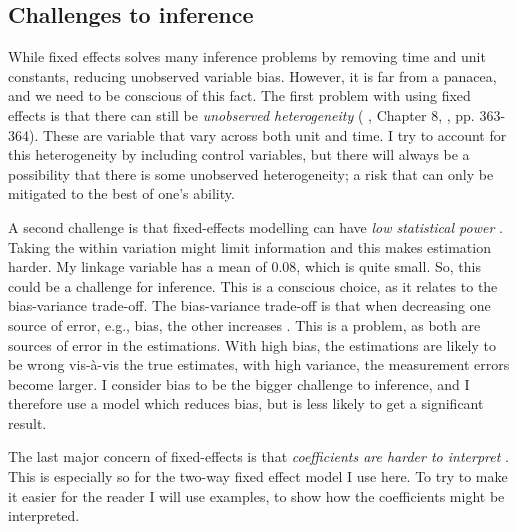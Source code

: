 \subsection{Challenges to inference}
While fixed effects solves many inference problems by removing time and unit constants, reducing unobserved variable bias. However, it is far from a panacea, and we need to be conscious of this fact. The first problem with using fixed effects is that there can still be \textit{unobserved heterogeneity} (\citeauthor{cunningham_causal_2021} \citeyear{cunningham_causal_2021}, Chapter 8, \citeauthor{hill_limitations_2020} \citeyear{hill_limitations_2020}, pp. 363-364). These are variable that vary across both unit and time. I try to account for this heterogeneity by including control variables, but there will always be a possibility that there is some unobserved heterogeneity; a risk that can only be mitigated to the best of one's ability.

A second challenge is that fixed-effects modelling can have \textit{low statistical power} \citep[pp. 361-362]{hill_limitations_2020}. Taking the within variation might limit information and this makes estimation harder. My linkage variable has a mean of 0.08, which is quite small. So, this could be a challenge for inference. This is a conscious choice, as it relates to the bias-variance trade-off. The bias-variance trade-off is that when decreasing one source of error, e.g., bias, the other increases \citep[pp. 37-38]{hastie_elements_2009}. This is a problem, as both are sources of error in the estimations. With high bias, the estimations are likely to be wrong vis-à-vis the true estimates, with high variance, the measurement errors become larger\citep[pp. 37-38]{hastie_elements_2009}. I consider bias to be the bigger challenge to inference, and I therefore use a model which reduces bias, but is less likely to get a significant result.

The last major concern of fixed-effects is that \textit{coefficients are harder to interpret} \citep[pp. 364-365]{hill_limitations_2020}. This is especially so for the two-way fixed effect model I use here. To try to make it easier for the reader I will use examples, to show how the coefficients might be interpreted.

